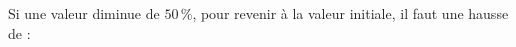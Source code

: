 
Si une valeur diminue de $50\,\%$, pour revenir à la valeur initiale, il faut une hausse de :

\smallskip

